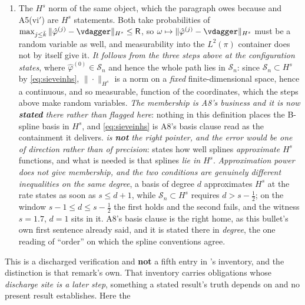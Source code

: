 \begin{enumerate}
{formula; it is \textbf{stated} in this definition's opening and in (P-a.1) of \cref{prp:phirate}, and is
cited rather than imposed here}, gives the claim for $\hat\varphi=\hat\varphi^{(\bar k)}$.
\item[--] The $H^{s}$ norm of the same object, which the paragraph owes because  and
A5(vi$'$) are $H^{s}$ statements. Both take probabilities of
$\max_{j\le\bar k}\|\hat\varphi^{(j)}-\vdagger\|_{H^{s}}\le\mathsf R$, so
$\omega\mapsto\|\hat\varphi^{(j)}-\vdagger\|_{H^{s}}$ must be a random variable as well, and measurability
into the $L^{2}(\pi)$ container does not by itself give it. \emph{It follows from the three steps above at the
configuration  states}, where $\hat\varphi^{(0)}\in\mathcal S_n$ and hence the whole path
lies in $\mathcal S_n$: since $\mathcal S_n\subset H^{s}$ by \eqref{eq:sieveinhs}, $\|\cdot\|_{H^{s}}$ is a
norm on a \emph{fixed} finite-dimensional space, hence a continuous, and so measurable, function of the
coordinates, which the steps above make random variables. \emph{The membership is A8's business and it is now
\textbf{stated} there rather than flagged here}: nothing in this definition places the B-spline basis in
$H^{s}$, and \eqref{eq:sieveinhs} is A8's basis clause read as the containment it delivers.
\emph{ is \textbf{not} the right pointer, and the error would be one of direction
rather than of precision}:  states how well splines \emph{approximate}
$H^{s}$ functions, and what is needed is that splines \emph{lie in} $H^{s}$. \emph{Approximation power does
not give membership, and the two conditions are genuinely different inequalities on the same degree}, a
basis of degree $d$ approximates $H^{s}$ at the rate  states as soon as $s\le d+1$, while
$\mathcal S_n\subset H^{s}$ requires $d>s-\tfrac12$; on the window $s-1\le d\le s-\tfrac12$ the first holds
and the second fails, and the witness $s=1.7$, $d=1$ sits in it. A8's basis clause is the
right home, as this bullet's own first sentence already said, and it is stated there in \emph{degree}, the
one reading of ``order'' on which the spline conventions agree.
\end{enumerate}
This is a discharged verification and \textbf{not} a fifth entry in 's inventory,
and the distinction is that remark's own. That inventory carries obligations whose \emph{discharge site is a
later step}, something a stated result's truth depends on and no present result establishes. Here the
